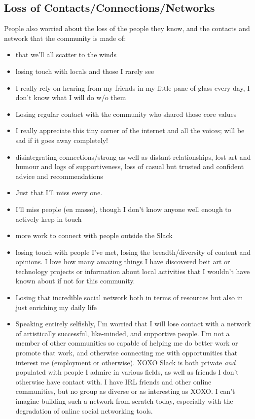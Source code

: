 \documentclass[
]{book}
\providecommand{\tightlist}{%
  \setlength{\itemsep}{0pt}\setlength{\parskip}{0pt}}
\begin{document}
\subsection{Loss of Contacts/Connections/Networks}\label{loss-of-contactsconnectionsnetworks}

People also worried about the loss of the people they know, and the contacts and network that the community is made of:

\begin{itemize}
\tightlist
\item
  that we'll all scatter to the winds
\item
  losing touch with locals and those I rarely see
\item
  I really rely on hearing from my friends in my little pane of glass every day, I don't know what I will do w/o them
\item
  Losing regular contact with the community who shared those core values
\item
  I really appreciate this tiny corner of the internet and all the voices; will be sad if it goes away completely!
\item
  disintegrating connections/strong as well as distant relationships, lost art and humour and logs of supportiveness, loss of casual but trusted and confident advice and recommendations
\item
  Just that I'll miss every one.
\item
  I'll miss people (en masse), though I don't know anyone well enough to actively keep in touch
\item
  more work to connect with people outside the Slack
\item
  losing touch with people I've met, losing the breadth/diversity of content and opinions. I love how many amazing things I have discovered beit art or technology projects or information about local activities that I wouldn't have known about if not for this community.
\item
  Losing that incredible social network both in terms of resources but also in just enriching my daily life
\item
  Speaking entirely selfishly, I'm worried that I will lose contact with a network of artistically successful, like-minded, and supportive people. I'm not a member of other communities so capable of helping me do better work or promote that work, and otherwise connecting me with opportunities that interest me (employment or otherwise). XOXO Slack is both private \emph{and} populated with people I admire in various fields, as well as friends I don't otherwise have contact with. I have IRL friends and other online communities, but no group as diverse or as interesting as XOXO. I can't imagine building such a network from scratch today, especially with the degradation of online social networking tools.

\end{itemize}
\end{document}
